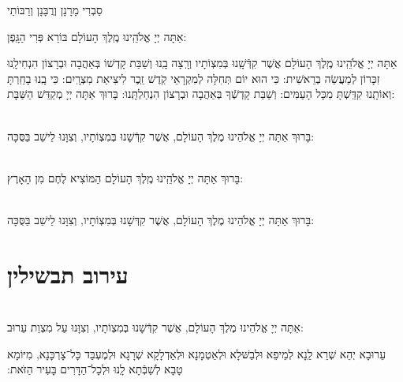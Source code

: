 \documentclass[twoside, openany, parskip=half, 11pt]{book}
\begin{document}
\begin{footnotesize}
סַבְרִי מָרָנָן וְרֲבָּנָן וְרַבּוֹתַי\\
\end{footnotesize}
 אַתָּה יְיָ אֱלֹהֵֽינוּ מֶֽלֶךְ הָעוֹלָם בּוֹרֵא פְּרִי הַגָּֽפֶן:

 אַתָּה יְיָ אֱלֹהֵֽינוּ מֶֽלֶךְ הָעוֹלָם אֲשֶׁר קִדְּֿשָֽׁנוּ בְּמִצְוֹתָיו וְרָֽצָה בָֽנוּ וְשַׁבַּת קָדְשׁוֹ בְּאַהֲבָה וּבְרָצוֹן הִנְחִילָֽנוּ זִכָּרוֹן לְמַעֲשֵׂה בְרֵאשִׁית: כִּי הוּא יוֹם תְּחִלָּה לְמִקְרָאֵי קֹֽדֶשׁ זֵֽכֶר לִיצִיאַת מִצְרָֽיִם: כִּי בָֽנוּ בָחַֽרְתָּ וְאוֹתָֽנוּ קִדַּֽשְׁתָּ מִכָּל הָעַמִּים: וְשַׁבַּת קָדְשְֿׁךָ בְּאַהֲבָה וּבְרָצוֹן הִנְחַלְתָּֽנוּ: בָּרוּךְ אַתָּה יְיָ מְקַדֵּשׁ הַשַּׁבָּת:

\begin{sometimes}

\\
בָּרוּךְ אַתָּה יְיָ אֱלֹהֵינוּ מֶלֶךְ הָעוֹלָם, אֲשֶׁר קִדְּֿשָׁנוּ בְּמִצְוֹתָיו, וְצִוָּנוּ לֵישֵׁב בַּסֻּכָּה:

\end{sometimes}

\\
בָּרוּךְ אַתָּה יְיָ אֱלֹהֵֽינוּ מֶֽלֶךְ הָעוֹלָם הַמּוֹצִיא לֶחֶם מִן הָאָרֶץ:

\enlargethispage{\baselineskip}

\begin{sometimes}

\\
בָּרוּךְ אַתָּה יְיָ אֱלֹהֵינוּ מֶלֶךְ הָעוֹלָם, אֲשֶׁר קִדְּשָׁנוּ בְּמִצְוֹתָיו, וְצִוָּנוּ לֵישֵׁב בַּסֻּכָּה:

\end{sometimes}

\clearpage

\section[עירוב תבשילין]{ עירוב תבשילין }

\\
 אַתָּה יְיָ אֱלֹהֵינוּ מֶלֶךְ הָעוֹלָם, אֲשֶׁר קִדְּֿשָׁנוּ בְּמִצְוֹתָיו, וְצִוָּנוּ עַל מִצְוַת עֵרוּב:

 עֵרוּבָא יְהֵא שְׁרֵא לַֽנָא לְמֵיפֵא וּלְבַשּּׁלָא וּלְאַטְמָנָא וּלְאַדְלָקָא שְׁרָגָא וּלְמֶעְבַּד כָּל־צָרְכָּנָא, מִיּוֹמָא טָבָא לְשַׁבְּֿתָא לָֽנוּ וּלְכָל־הַדָּרִים בָּעִיר הַזּׂאת:‏
\end{document}

